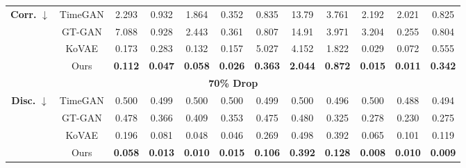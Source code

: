 \documentclass{article}
\theoremstyle{plain}
\theoremstyle{definition}
\theoremstyle{remark}
\begin{document}
\begin{table}[!t]
{\begin{tabular}{cc|cccccccccc}
    \multirow{4}{*}{\textbf{Corr.} $\downarrow$} 
      & TimeGAN 
         & 2.293 
         & 0.932 
         & 1.864 
         & 0.352 
         & 0.835 
         & 13.79 
         & 3.761 
         & 2.192 
         & 2.021 
         & 0.825 \\
      & GT-GAN  
         & 7.088 
         & 0.928 
         & 2.443 
         & 0.361 
         & 0.807 
         & 14.91 
         & 3.971 
         & 3.204 
         & 0.255 
         & 0.804 \\
      & KoVAE   
         & 0.173 
         & 0.283 
         & 0.132 
         & 0.157 
         & 5.027 
         & 4.152 
         & 1.822 
         & 0.029 
         & 0.072 
         & 0.555 \\
      & Ours    
         & \cellcolor{blue!10}\textbf{0.112}
         & \cellcolor{blue!10}\textbf{0.047}
         & \cellcolor{blue!10}\textbf{0.058}
         & \cellcolor{blue!10}\textbf{0.026}
         & \cellcolor{blue!10}\textbf{0.363}
         & \cellcolor{blue!10}\textbf{2.044}
         & \cellcolor{blue!10}\textbf{0.872}
         & \cellcolor{blue!10}\textbf{0.015}
         & \cellcolor{blue!10}\textbf{0.011}
         & \cellcolor{blue!10}\textbf{0.342} \\
    \midrule
    
    \multicolumn{12}{c}{\textbf{70\% Drop}} \\[3pt] 
    \midrule
    \multirow{4}{*}{\textbf{Disc.} $\downarrow$} 
      & TimeGAN 
         & 0.500 
         & 0.499 
         & 0.500 
         & 0.500 
         & 0.499 
         & 0.500 
         & 0.496 
         & 0.500 
         & 0.488 
         & 0.494 \\
      & GT-GAN  
         & 0.478 
         & 0.366 
         & 0.409 
         & 0.353 
         & 0.475 
         & 0.480 
         & 0.325 
         & 0.278 
         & 0.230 
         & 0.275 \\
      & KoVAE   
         & 0.196 
         & 0.081 
         & 0.048 
         & 0.046 
         & 0.269 
         & 0.498 
         & 0.392 
         & 0.065 
         & 0.101 
         & 0.119 \\
      & Ours    
         & \cellcolor{blue!10}\textbf{0.058}
         & \cellcolor{blue!10}\textbf{0.013}
         & \cellcolor{blue!10}\textbf{0.010}
         & \cellcolor{blue!10}\textbf{0.015}
         & \cellcolor{blue!10}\textbf{0.106}
         & \cellcolor{blue!10}\textbf{0.392}
         & \cellcolor{blue!10}\textbf{0.128}
         & \cellcolor{blue!10}\textbf{0.008}
         & \cellcolor{blue!10}\textbf{0.010}
         & \cellcolor{blue!10}\textbf{0.009} \\
    \midrule
    

\end{tabular}}
\end{table}
\end{document}

